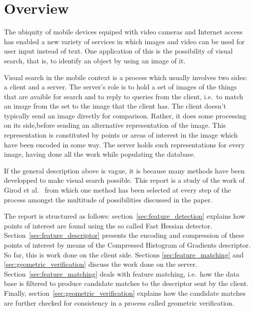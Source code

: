 \section{Overview}

The ubiquity of mobile devices equiped with video cameras and Internet access has enabled a new variety of services in which images and video can be used for user input instead of text. One application of this is the possibility of visual search, that is, to identify an object by using an image of it.

Visual search in the mobile context is a process which usually involves two sides: a client and a server. The server's role is to hold a set of images of the things that are avaible for search and to reply to queries from the client, i.e.\ to match an image from the set to the image that the client has. The client doesn't typically send an image directly for comparison. Rather, it does some processing on its side,before sending an alternative representation of the image. This representation is constituted by points or areas of interest in the image which have been encoded in some way. The server holds such representations for every image, having done all the work while populating the database.

If the general description above is vague, it is because many methods have been developped to make visual search possible. This report is a study of the work of Girod et al.\ \cite{girod2011mobile} from which one method has been selected at every step of the process amongst the multitude of possibilities discussed in the paper.

The report is structured as follows: section~\ref{sec:feature_detection} explains how points of interest are found using the so called Fast Hessian detector. Section~\ref{sec:feature_descriptor} presents the encoding and compression of these points of interest by means of the Compressed Histogram of Gradients descriptor. So far, this is work done on the client side. Sections \ref{sec:feature_matching} and \ref{sec:geometric_verification} discuss the work done on the server. Section~\ref{sec:feature_matching} deals with feature matching, i.e.\ how the data base is filtered to produce candidate matches to the descriptor sent by the client. Finally, section~\ref{sec:geometric_verification} explains how the candidate matches are further checked for consistency in a process called geometric verification.
